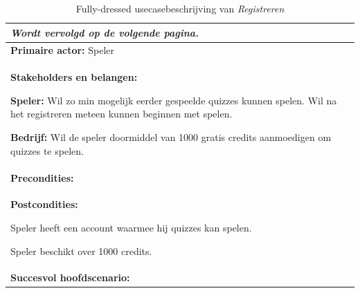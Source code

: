 \begin{xltabular}{\textwidth}{X}
   \caption{Fully-dressed usecasebeschrijving van \textit{Registreren}} \label{tab:usecaseregistreren} \\ \hline \endfirsthead\endhead
   \hspace*{\fill}\textit{Wordt vervolgd op de volgende pagina.} \\ \hline \endfoot\endlastfoot

   \textbf{Primaire actor:} Speler                  \\

   \hline

   \begin{minipage}[t]{\linewidth}
      \textbf{Stakeholders en belangen:}
      \begin{smallitemize}
         \item \textbf{Speler:} Wil zo min mogelijk eerder gespeelde quizzes kunnen spelen. Wil na het registreren meteen kunnen beginnen met spelen.
         \item \textbf{Bedrijf:} Wil de speler doormiddel van 1000 gratis credits aanmoedigen om quizzes te spelen.
      \end{smallitemize}
   \end{minipage} \\

   \hline

   \begin{minipage}[t]{\linewidth}
      \textbf{Precondities:}
   \end{minipage} \\

   \hline

   \begin{minipage}[t]{\linewidth}
      \textbf{Postcondities:}
      \begin{smallitemize}
         \item Speler heeft een account waarmee hij quizzes kan spelen.
         \item Speler beschikt over 1000 credits.
      \end{smallitemize}
   \end{minipage} \\

   \hline

   \begin{minipage}[t]{\linewidth}
      \textbf{Succesvol hoofdscenario:}


\end{minipage}
\end{xltabular}
